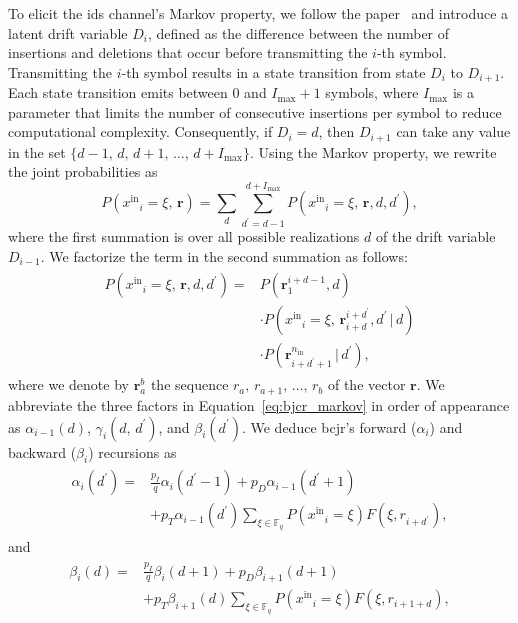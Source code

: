 \documentclass[conference,letterpaperu]{IEEEtran}
\newcommand{\vv}{\ensuremath{\,\vert\,}}
\newcommand{\cc}{\ensuremath{,\,}}
\newcommand{\pdel}{\ensuremath{p_D}}
\newcommand{\pins}{\ensuremath{p_I}}
\newcommand{\ptrans}{\ensuremath{p_T}}
\newcommand{\yinIx}{\ensuremath{x^{\text{in}}}}
\newcommand{\Yval}{\ensuremath{\xi}}
\newcommand{\nin}{\ensuremath{n_{\text{in}}}}
\newcommand{\rec}{\ensuremath{\bm{r}}}
\newcommand{\recIx}{\ensuremath{r}}
\newcommand{\dfrom}{\ensuremath{d}}
\newcommand{\dto}{\ensuremath{d^{\prime}}}
\newcommand{\alphabet}{\ensuremath{\mathbb{F}_q}}
\begin{document}
To elicit the \ac{ids} channel's Markov property, we follow the paper~\cite{daveyReliableCommunicationChannels2001} and introduce a latent drift variable \( D_i \), defined as the difference between the number of insertions and deletions that occur before transmitting the \( i \)-th symbol. Transmitting the $i$-th symbol results in a state transition from state $D_i$ to $D_{i + 1}$. Each state transition emits between $0$ and $I_{\max} + 1$ symbols, where $I_{\max}$ is a parameter that limits the number of consecutive insertions per symbol to reduce computational complexity.  Consequently, if $D_i = \dfrom$, then $D_{i+1}$ can take any value in the set $\{ \dfrom- 1\cc \dfrom\cc \dfrom + 1\cc \ldots\cc \dfrom + I_{\max}\}$. Using the Markov property, we rewrite the joint probabilities as 
\begin{equation*}
 P(\yinIx_i = \Yval \cc \rec) = \sum_{\dfrom}\sum_{\dto = \dfrom - 1}^{\dfrom + I_{\max}} P(\yinIx_i = \Yval \cc \rec, \dfrom, \dto),  
\end{equation*}
where the first summation is over all possible realizations $\dfrom$ of the drift variable $D_{i-1}$. We factorize the term in the second summation as follows:
\begin{align}
\begin{split}
\label{eq:bjcr_markov}
    P(\yinIx_i = \Yval \cc \rec, \dfrom, \dto) = &P(\rec_1^{i + \dfrom - 1}, \dfrom)\\ &\cdot P(\yinIx_i = \Yval \cc \rec_{i + \dfrom}^{i + \dto}, \dto \vv \dfrom) \\ &\cdot 
    P(\rec_{i + \dto + 1}^{\nin} \vv \dto),
\end{split}
\end{align}
where we denote by $\rec_a^b$ the sequence $\recIx_a \cc \recIx_{a+1}\cc \ldots \cc \recIx_b$ of the vector $\rec$. We abbreviate the three factors in Equation~\eqref{eq:bjcr_markov} in order of appearance as $\alpha_{i-1}(\dfrom)$, $\gamma_i(\dfrom\cc \dto)$, and $\beta_i(\dto)$.
We deduce \ac{bcjr}'s forward (\( \alpha_i \)) and backward (\( \beta_i \)) recursions as
\begin{align*}
\begin{split}
\alpha_{i}(\dto) = &\frac{\pins}{q}\alpha_i(\dto-1) + \pdel \alpha_{i-1}(\dto+1) \\ 
&+ \ptrans \alpha_{i-1}(\dto) \sum_{\Yval \in \alphabet}P(\yinIx_i = \Yval)F(\Yval, \recIx_{i + \dto}),
\end{split}
\end{align*}
and
\begin{align*}
\begin{split}
\beta_{i}(\dfrom) = &\frac{\pins}{q}\beta_i(\dfrom +1) + \pdel \beta_{i+1}(\dfrom+1) \\ 
&+ \ptrans \beta_{i+1}(\dfrom) \sum_{\Yval \in \alphabet}P(\yinIx_i = \Yval)F(\Yval, \recIx_{i + 1 + \dfrom}),
\end{split}
\end{align*}
\end{document}
